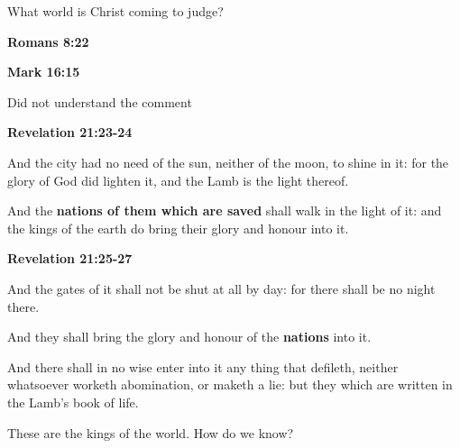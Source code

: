 \documentclass[dark]{gsf-presentation}
\begin{document}
\begin{frame}
	\LARGE
	What world is Christ coming to judge?
\end{frame}

\begin{frame}[plain]{\textbf{\textcolor{SecondColor}{\LARGE Romans 8:22}}}
	\LARGE
\end{frame}

\begin{frame}[plain]{\textbf{\textcolor{SecondColor}{\LARGE Mark 16:15}}}
	\LARGE
\end{frame}

\begin{frame}
	\LARGE
	Did not understand the comment
\end{frame}

\begin{frame}[plain]{\textbf{\textcolor{SecondColor}{\LARGE Revelation 21:23-24}}}
	\LARGE
	\begin{center}
		And the city had no need of the sun, neither of
		the moon, to shine in it: for the glory of God
		did lighten it, and the Lamb is the light thereof.

		\vspace{2mm}
		And the \textbf{nations of them which are saved}
		shall walk in the light of it: and the kings of 
		the earth do bring their glory and honour into it.
	\end{center}
\end{frame}

\begin{frame}[plain]{\textbf{\textcolor{SecondColor}{\LARGE Revelation 21:25-27}}}
	\LARGE
	\begin{center}
		And the gates of it shall not be shut at all by day:
		for there shall be no night there.

		\vspace{2mm}
		And they shall bring the glory and honour of the
		\textbf{nations} into it.

		\vspace{2mm}
		And there shall in no wise enter into it any thing
		that defileth, neither whatsoever worketh abomination,
		or maketh a lie: but they which are written in the
		Lamb's book of life.
	\end{center}
\end{frame}

\begin{frame}
	These are the kings of the world. How do we know?
\end{frame}
\end{document}
